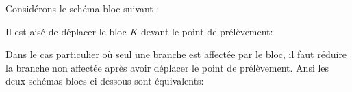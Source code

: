 Considérons le schéma-bloc suivant :
\begin{center}
\end{center}                                                                                                                  
Il est aisé de déplacer le bloc $K$ devant le point de prélèvement:  
\begin{center}
\end{center}

Dans le cas particulier où seul une branche est affectée par le bloc, il faut réduire la branche non affectée après avoir 
déplacer le point de prélèvement. Ansi les deux schémas-blocs ci-dessous sont équivalents:

